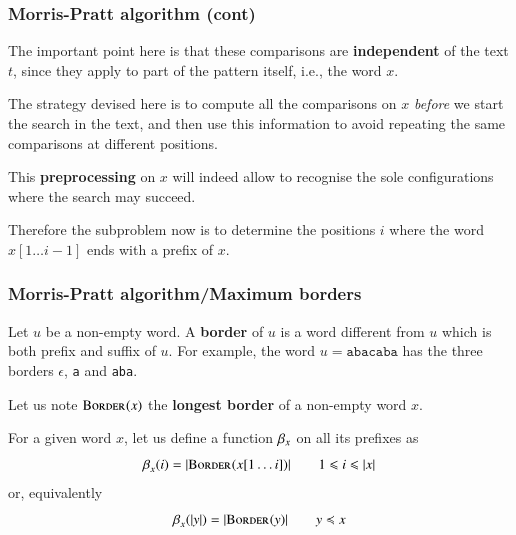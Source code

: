 %
\begin{frame}
\frametitle{Morris-Pratt algorithm (cont)}

The important point here is that these comparisons are
\textbf{independent} of the text \(t\), since they apply to part of
the pattern itself, i.e., the word \(x\).

\bigskip

The strategy devised here is to compute all the comparisons on \(x\)
\emph{before} we start the search in the text, and then use this
information to avoid repeating the same comparisons at different
positions.

\bigskip

This \textbf{preprocessing} on \(x\) will indeed allow to recognise
the sole configurations where the search may succeed.

\bigskip

Therefore the subproblem now is to determine the positions \(i\) where
the word \(x[1 \dots i-1]\) ends with a prefix of \(x\).

\end{frame}

%
\begin{frame}
\frametitle{Morris-Pratt algorithm/Maximum borders}

\label{MP_supply_def}

Let \(u\) be a non-empty word. A \textbf{border} of \(u\) is a word
different from \(u\) which is both prefix and suffix of \(u\). For
example, the word \(u = \texttt{abacaba}\) has the three borders
\(\epsilon\), \texttt{a} and \texttt{aba}.

\bigskip

Let us note \(\textsc{Border}^{}(x)\) the \textbf{longest border} of a non-empty
word \(x\).

\bigskip

For a given word \(x\), let us define a function \(\beta_{x}\) on
all its prefixes as
\[
  \beta_{x}^{}(i) = \lvert{\textsc{Border}^{}(x[1 \dots i])}\lvert{}
  \qquad 1 \leqslant i \leqslant \lvert{x}\lvert{}
\]
or, equivalently
\[
\beta_{x}^{}(\lvert{y}\lvert{}) = \lvert{\textsc{Border}^{}(y)}\lvert{} \qquad y \preccurlyeq x
\]

\end{frame}

